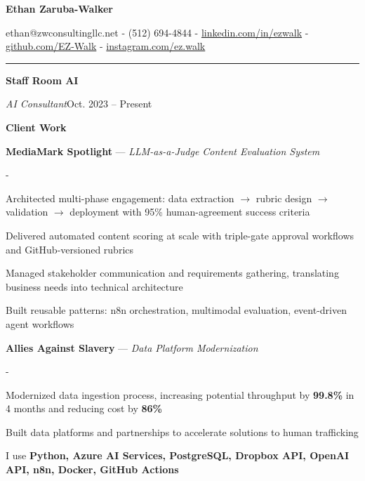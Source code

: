 \documentclass[10pt,letterpaper]{article}
\newenvironment{cvitems}{%
  \begin{list}{-}{%
    \setlength{\leftmargin}{12pt}%
    \setlength{\itemsep}{1.2pt}%
    \setlength{\parsep}{0pt}%
    \setlength{\topsep}{1.5pt}%
    \setlength{\partopsep}{0pt}%
    \setlength{\labelwidth}{6pt}%
    \setlength{\labelsep}{6pt}%
    \setlength{\itemindent}{0pt}%
  }%
}{\end{list}}
\newcommand{\cvsection}[1]{%
  \vspace{7pt}%
  \noindent{\bfseries\fontsize{11pt}{13pt}\selectfont\MakeUppercase{#1}}\par
  \vspace{1pt}%
  \noindent\rule{\textwidth}{0.4pt}\par
  \vspace{4pt}%
}
\newcommand{\cventryhead}[4]{%
  \noindent\textbf{#1}\hfill#2\par
  \vspace{0.5pt}%
  \noindent\textit{#3}\hfill#4\par
}
\begin{document}
\begin{center}
  {\bfseries\fontsize{22pt}{24pt}\selectfont Ethan Zaruba-Walker\par}
  \vspace{4pt}
  {\fontsize{10pt}{12pt}\selectfont
    ethan@zwconsultingllc.net
    {-}
    (512) 694-4844
    {-}
    \href{https://linkedin.com/in/ezwalk}{linkedin.com/in/ezwalk}
    {-}
    \href{https://github.com/EZ-Walk}{github.com/EZ-Walk}
    {-}
    \href{https://www.instagram.com/ez.walk/}{instagram.com/ez.walk}\par}
\end{center}
\vspace{2pt}

\cvsection{Work Experience}

\cventryhead{Staff Room AI}{}{AI Consultant}{Oct. 2023 -- Present}
\vspace{3pt}
\noindent\textbf{Client Work}\par
\vspace{2pt}
\noindent\textbf{MediaMark Spotlight} --- \textit{LLM-as-a-Judge Content Evaluation System}\par
\begin{cvitems}
  \item Architected multi-phase engagement: data extraction $\rightarrow$ rubric design $\rightarrow$ validation $\rightarrow$ deployment with 95\% human-agreement success criteria
  \item Delivered automated content scoring at scale with triple-gate approval workflows and GitHub-versioned rubrics
  \item Managed stakeholder communication and requirements gathering, translating business needs into technical architecture
  \item Built reusable patterns: n8n orchestration, multimodal evaluation, event-driven agent workflows
\end{cvitems}
\vspace{3pt}
\noindent\textbf{Allies Against Slavery} --- \textit{Data Platform Modernization}\par
\begin{cvitems}
  \item Modernized data ingestion process, increasing potential throughput by \textbf{99.8\%} in 4 months and reducing cost by \textbf{86\%}
  \item Built data platforms and partnerships to accelerate solutions to human trafficking
\end{cvitems}
\vspace{3pt}
\noindent I use \textbf{Python, Azure AI Services, PostgreSQL, Dropbox API, OpenAI API, n8n, Docker, GitHub Actions}\par
\end{document}

